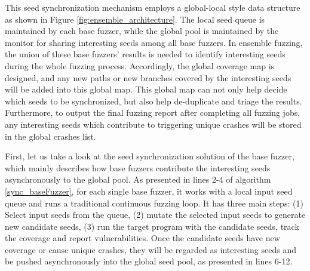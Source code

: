 This seed synchronization mechanism employs a global-local style data structure as shown in Figure \ref{fig:ensemble_architecture}. The local seed queue is maintained by each base fuzzer, while the global pool is maintained by the monitor for sharing interesting seeds among all base fuzzers. In ensemble fuzzing, the union of these base fuzzers' results is needed to identify interesting seeds during the whole fuzzing process. Accordingly, the global coverage map is designed, and any new paths or new branches covered by the interesting seeds will be added into this global map. This global map can not only help decide which seeds to be synchronized, but also help de-duplicate and triage the results. Furthermore, to output the final fuzzing report after completing all fuzzing jobs, any interesting seeds which contribute to triggering unique crashes will be stored in the global crashes list.


First, let us take a look at the seed synchronization solution of the base fuzzer, which mainly describes how base fuzzers contribute the interesting seeds asynchronously to the global pool. As presented in lines 2-4 of algorithm \ref{sync_baseFuzzer}, 
for each single base fuzzer, it works with a local input seed queue and runs a traditional continuous fuzzing loop. It has three main steps: (1) Select input seeds from the queue, (2) mutate the selected input seeds to generate new candidate seeds, (3) run the target program with the candidate seeds, track the coverage and report vulnerabilities. Once the candidate seeds have new coverage or cause unique crashes, they will be regarded as interesting seeds and be pushed asynchronously into the global seed pool, as presented in lines 6-12. %





